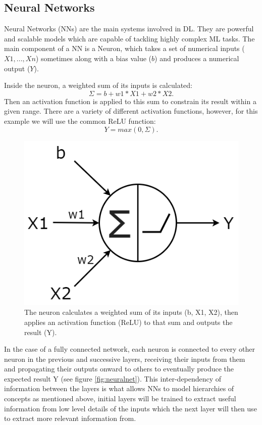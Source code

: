 \documentclass{l4proj}
\begin{document}
\subsection{Neural Networks}
\label{nn}
Neural Networks (NNs) are the main systems involved in DL. They are powerful and scalable models which are capable of tackling highly complex ML tasks. The main component of a NN is a Neuron, which takes a set of numerical inputs ($X1, ... , Xn$) sometimes along with a bias value ($b$) and produces a numerical output ($Y$).

Inside the neuron, a weighted sum of its inputs is calculated:
\begin{equation}
    \Sigma = b + w1 * X1 + w2 * X2.
\end{equation}
Then an activation function is applied to this sum to constrain its result within a given range. There are a variety of different activation functions, however, for this example we will use the common ReLU function:
\begin{equation}\label{eq:sigma} 
    Y = max(0, \Sigma).
\end{equation}

\begin{figure}[h]
    \centering
    \includegraphics[width=0.4\linewidth]{images/Neuron.png}    

    \caption{The neuron calculates a weighted sum of its inputs (b, X1, X2), then applies an activation function (ReLU) to that sum and outputs the result (Y).}

    \label{fig:neuron} 
\end{figure}

In the case of a fully connected network, each neuron is connected to every other neuron in the previous and successive layers, receiving their inputs from them and propagating their outputs onward to others to eventually produce the expected result Y (see figure \ref{fig:neuralnet}). This inter-dependency of information between the layers is what allows NNs to model hierarchies of concepts as mentioned above, initial layers will be trained to extract useful information from low level details of the inputs which the next layer will then use to extract more relevant information from. 
\end{document}
